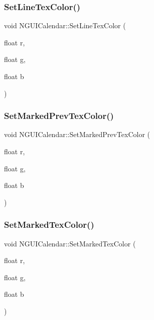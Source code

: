 \hypertarget{class_n_g_u_i_calendar_afe228ce84ae92c12f268bdf3640eb01f}{}\label{class_n_g_u_i_calendar_afe228ce84ae92c12f268bdf3640eb01f} 
\subsubsection{\texorpdfstring{Set\+Line\+Tex\+Color()}{SetLineTexColor()}}
{\footnotesize\ttfamily void N\+G\+U\+I\+Calendar\+::\+Set\+Line\+Tex\+Color (\begin{DoxyParamCaption}\item[{float}]{r,  }\item[{float}]{g,  }\item[{float}]{b }\end{DoxyParamCaption})}

\hypertarget{class_n_g_u_i_calendar_a69ea97a185ca0e3d3892b0e685224523}{}\label{class_n_g_u_i_calendar_a69ea97a185ca0e3d3892b0e685224523} 
\subsubsection{\texorpdfstring{Set\+Marked\+Prev\+Tex\+Color()}{SetMarkedPrevTexColor()}}
{\footnotesize\ttfamily void N\+G\+U\+I\+Calendar\+::\+Set\+Marked\+Prev\+Tex\+Color (\begin{DoxyParamCaption}\item[{float}]{r,  }\item[{float}]{g,  }\item[{float}]{b }\end{DoxyParamCaption})}

\hypertarget{class_n_g_u_i_calendar_a63fafea9e73725dd5e7d2dd94b32cb3b}{}\label{class_n_g_u_i_calendar_a63fafea9e73725dd5e7d2dd94b32cb3b} 
\subsubsection{\texorpdfstring{Set\+Marked\+Tex\+Color()}{SetMarkedTexColor()}}
{\footnotesize\ttfamily void N\+G\+U\+I\+Calendar\+::\+Set\+Marked\+Tex\+Color (\begin{DoxyParamCaption}\item[{float}]{r,  }\item[{float}]{g,  }\item[{float}]{b }\end{DoxyParamCaption})}

